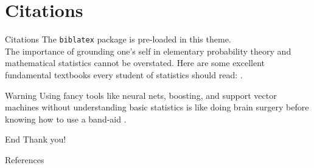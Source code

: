 \documentclass[]{beamer}
\begin{document}
\section{Citations}

\begin{frame}{Citations}
	The \texttt{biblatex} package is pre-loaded in this theme.\\[1em]
	
	The importance of grounding one's self in elementary probability theory and mathematical statistics cannot be overstated.
	Here are some excellent fundamental textbooks every student of statistics should read: \citet{casella2002statistical,	pawitan2001all, wasserman2013all}.
	
	
	\begin{alertblock}{Warning}
		Using fancy tools like neural nets, boosting, and support vector machines without understanding basic statistics is like doing brain surgery before knowing how to use a band-aid \citep{wasserman2013all}.
	\end{alertblock}

\end{frame}



\begin{frame}{End}
\centering
	\Huge Thank you!
\end{frame}

\nocite{*}

    \begin{frame}{References}
    \printbibliography[heading=none]
    \end{frame}
\end{document}
